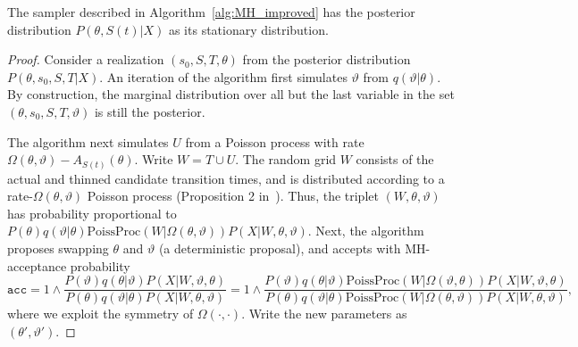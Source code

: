 \begin{proposition}
  The sampler described in Algorithm~\ref{alg:MH_improved} has the posterior distribution $P(\theta,S(t)|X)$ as its stationary distribution.
\end{proposition}
\begin{proof}
  Consider a realization $(s_0,S,T,\theta)$ from the posterior distribution $P(\theta, s_0, S, T|X)$. An iteration of the algorithm first simulates $\vartheta$ from $q(\vartheta|\theta)$. By construction, the marginal distribution over all but the last variable in the set $(\theta, s_0, S, T, \vartheta)$ is still the posterior.

  The algorithm next simulates $U$ from a Poisson process with rate $\Omega(\theta,\vartheta) - A_{S(t)}(\theta)$. Write $W = T \cup U$.
  The random grid $W$ consists of the actual and thinned candidate transition times, and is distributed according to a rate-$\Omega(\theta, \vartheta)$ Poisson process (Proposition 2 in~\cite{RaoTeh13}). 
  Thus, the triplet $(W,\theta,\vartheta)$ has probability proportional to $P(\theta)q(\vartheta|\theta)\text{PoissProc}(W|\Omega(\theta,\vartheta)) P(X|W,\theta,\vartheta)$.
  Next, the algorithm proposes swapping $\theta$ and $\vartheta$ 
  (a deterministic proposal), and accepts with MH-acceptance probability 
  $$\texttt{acc} = 
  1 \wedge \frac{P(\vartheta)q(\theta|\vartheta)
P(X|W,\vartheta,\theta)}{P(\theta)q(\vartheta|\theta)
P(X|W,\theta,\vartheta)} =
1 \wedge \frac{P(\vartheta)q(\theta|\vartheta)\text{PoissProc}(W|\Omega(\vartheta,\theta)) P(X|W,\vartheta,\theta)}{P(\theta)q(\vartheta|\theta)\text{PoissProc}(W|\Omega(\theta,\vartheta))
P(X|W,\theta,\vartheta)},$$
where we exploit the symmetry of $\Omega(\cdot,\cdot)$.
Write the new parameters as $(\theta', \vartheta')$. 


\end{proof}
